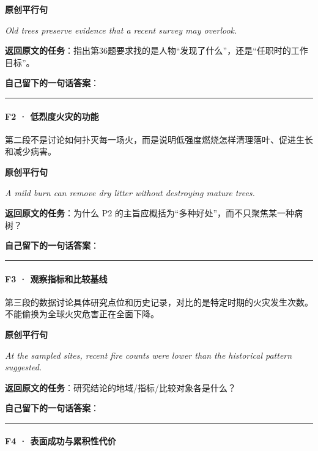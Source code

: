 \documentclass[
  11pt,
]{ctexart}
\renewenvironment{quote}{\begin{tcolorbox}[enhanced,breakable,colback=sand,colframe=primary!22,boxrule=0.4pt,arc=2pt,left=2.6mm,right=2.6mm,top=1.6mm,bottom=1.6mm]\itshape}{\end{tcolorbox}}
\begin{document}
\textbf{原创平行句}

\begin{quote}
Old trees preserve evidence that a recent survey may overlook.
\end{quote}

\textbf{返回原文的任务}：指出第36题要求找的是人物``发现了什么''，还是``任职时的工作目标''。

\textbf{自己留下的一句话答案}：

\rule{0.75\linewidth}{0.35pt}

\paragraph{F2 ·
低烈度火灾的功能}\label{f2-ux4f4eux70c8ux5ea6ux706bux707eux7684ux529fux80fd}

第二段不是讨论如何扑灭每一场火，而是说明低强度燃烧怎样清理落叶、促进生长和减少病害。

\textbf{原创平行句}

\begin{quote}
A mild burn can remove dry litter without destroying mature trees.
\end{quote}

\textbf{返回原文的任务}：为什么 P2
的主旨应概括为``多种好处''，而不只聚焦某一种病树？

\textbf{自己留下的一句话答案}：

\rule{0.75\linewidth}{0.35pt}

\paragraph{F3 ·
观察指标和比较基线}\label{f3-ux89c2ux5bdfux6307ux6807ux548cux6bd4ux8f83ux57faux7ebf}

第三段的数据讨论具体研究点位和历史记录，对比的是特定时期的火灾发生次数。不能偷换为全球火灾危害正在全面下降。

\textbf{原创平行句}

\begin{quote}
At the sampled sites, recent fire counts were lower than the historical
pattern suggested.
\end{quote}

\textbf{返回原文的任务}：研究结论的地域/指标/比较对象各是什么？

\textbf{自己留下的一句话答案}：

\rule{0.75\linewidth}{0.35pt}

\paragraph{F4 ·
表面成功与累积性代价}\label{f4-ux8868ux9762ux6210ux529fux4e0eux7d2fux79efux6027ux4ee3ux4ef7}
\end{document}
